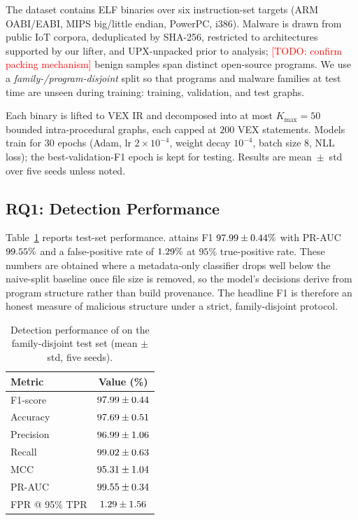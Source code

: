 \documentclass{llncs}
\begin{document}
The dataset contains \dsTotal{} ELF binaries over six instruction-set
targets (ARM OABI/EABI, MIPS big/little endian, PowerPC, i386). Malware is
drawn from public IoT corpora, deduplicated by SHA-256, restricted to
architectures supported by our lifter, and UPX-unpacked prior to analysis;
\textcolor{red}{[TODO: confirm packing mechanism]}
benign samples span \dsBenignProg{} distinct open-source programs. We use a
\emph{family-/program-disjoint} split so that programs and malware
families at test time are unseen during training: \dsTrain{} training,
\dsVal{} validation, and \dsTest{} test graphs.

Each binary is lifted to VEX IR and decomposed into at most $K_{\max}=50$
bounded intra-procedural graphs, each capped at $200$ VEX statements.
Models train for $30$ epochs (Adam, lr $2\times10^{-4}$, weight decay
$10^{-4}$, batch size $8$, NLL loss); the best-validation-F1 epoch is kept
for testing. Results are mean~$\pm$~std over five seeds unless noted.

\subsection{RQ1: Detection Performance}
\label{sec:detection}

Table~\ref{tab:detection} reports test-set performance. 
attains F1 $97.99{}\pm0.44{}\%$ with PR-AUC $99.55{}\%$ and a
false-positive rate of $1.29{}\%$ at $95\%$ true-positive rate. These
numbers are obtained where a metadata-only classifier drops well below the
naive-split baseline once file size is removed, so the model's decisions derive from program
structure rather than build provenance. The headline F1 is therefore an
honest measure of malicious structure under a strict, family-disjoint
protocol.

\begin{table}[t]
\centering
\caption{Detection performance of  on the family-disjoint test
set (mean $\pm$ std, five seeds).}
\label{tab:detection}
\begin{tabular}{lc}
\hline
Metric & Value (\%) \\
\hline
F1-score        & $97.99 \pm 0.44$ \\
Accuracy        & $97.69 \pm 0.51$ \\
Precision       & $96.99 \pm 1.06$ \\
Recall          & $99.02 \pm 0.63$ \\
MCC             & $95.31 \pm 1.04$ \\
PR-AUC          & $99.55 \pm 0.34$ \\
FPR @ 95\% TPR  & $1.29 \pm 1.56$ \\
\hline
\end{tabular}
\end{table}
\end{document}

